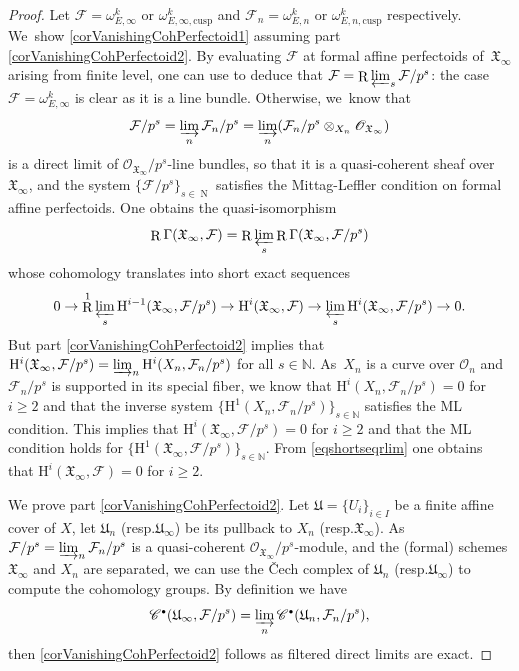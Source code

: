 \documentclass[11pt]{article}
\newcommand{\resp}{resp.\xspace}
\newcommand{\sbullet}{{\scriptscriptstyle\bullet}}
\newcommand{\cusp}{\mathrm{cusp}}
\numberwithin{equation}{section}
\theoremstyle{definition}
\newcommand{\bb}[1]{\mathbb{#1}}
\newcommand{\n}[1]{\mathcal{#1}}
\newcommand{\f}[1]{\mathfrak{#1}}
\newcommand{\s}[1]{\mathscr{#1}}
\DeclareMathOperator{\R}{R}
\DeclareMathOperator{\N}{N}
\begin{document}
\begin{proof}
Let $\n{F}= \omega^k_{E,\infty}$ or $\omega^{k}_{E,\infty,\cusp}$ and $\n{F}_n=\omega^k_{E,n}$ or $\omega^k_{E,n,\cusp}$ respectively. We~show \eqref{corVanishingCohPerfectoid1} assuming part \eqref{corVanishingCohPerfectoid2}. By evaluating $\n{F}$ at formal affine perfectoids of~$\f{X}_{\infty}$ arising from finite level, one can use \cite[Lem.\,3.18]{MR3090230} to deduce that $\n{F}= \R\varprojlim_s \n{F}/p^s$: the case $\n{F}= \omega_{E,\infty}^k$ is clear as it is a line bundle. Otherwise, we~know that
\[
\n{F}/p^s=\varinjlim_n \n{F}_n/p^s=\varinjlim_n (\n{F}_n/p^s\otimes_{X_n}\s{O}_{\f{X}_{\infty}})
\]
is a direct limit of $\s{O}_{\f{X}_{\infty}}/p^s$-line bundles, so that it is a quasi-coherent sheaf over~$\f{X}_{\infty}$, and the system $\{\n{F}/p^s\}_{s\in \N}$ satisfies the Mittag-Leffler condition on formal affine perfectoids. One obtains the quasi-isomorphism
\[
\R\Gamma(\f{X}_{\infty}, \n{F})= \R\varprojlim_s \R\Gamma(\f{X}_{\infty}, \n{F}/p^s)
\]
whose cohomology translates into short exact sequences
\begin{equation}
\label{eqshortseqrlim}
0\to \R^1\varprojlim_s \mathrm{H}^{i-1}(\f{X}_{\infty}, \n{F}/p^s) \to \mathrm{H}^{i}(\f{X}_{\infty}, \n{F}) \to \varprojlim_{s} \mathrm{H}^{i}(\f{X}_{\infty}, \n{F}/p^s) \to 0.
\end{equation}
But part \eqref{corVanishingCohPerfectoid2} implies that $\mathrm{H}^i(\f{X}_{\infty}, \n{F}/p^s)= \varinjlim_{n} \mathrm{H}^i(X_n, \n{F}_n/p^s)$ for all $s\in \bb{N}$. As~$X_n$ is a curve over $\n{O}_n$ and $\n{F}_n/p^s$ is supported in its special fiber, we know that $ \mathrm{H}^i(X_n, \n{F}_n/p^s)=0$ for $i\geq 2$ and that the inverse system $\{\mathrm{H}^1(X_n, \n{F}_n/p^s)\}_{s\in \bb{N}}$ satisfies the ML condition. This implies that $\mathrm{H}^i(\f{X}_{\infty}, \n{F}/p^s)=0$ for $i\geq 2$ and that the ML condition holds for $\{\mathrm{H}^1(\f{X}_{\infty}, \n{F}/p^s)\}_{s\in \bb{N}}$. From \eqref{eqshortseqrlim} one obtains that $\mathrm{H}^i(\f{X}_{\infty}, \n{F})=0$ for $i\geq 2$.

We prove part \eqref{corVanishingCohPerfectoid2}. Let $\f{U}=\{U_i\}_{i\in I}$ be a finite affine cover of $X$, let $\f{U}_n$ (\resp $\f{U}_{\infty}$) be its pullback to $X_n$ (\resp $\f{X}_{\infty}$). As $\n{F}/p^s=\varinjlim_n \n{F}_n/p^s$ is a quasi-coherent $\s{O}_{\f{X}_{\infty}}/p^s$-module, and the (formal) schemes $\f{X}_{\infty}$ and $X_n$ are separated, we can use the \v{C}ech complex of $\f{U}_n$ (\resp $\f{U}_{\infty}$) to compute the cohomology groups. By definition we have
\[
\s{C}^{\sbullet}(\f{U}_{\infty}, \n{F}/p^s) = \varinjlim_n \s{C}^{\sbullet}(\f{U}_n, \n{F}_n/p^s),
\]
then \eqref{corVanishingCohPerfectoid2} follows as filtered direct limits are exact.


\end{proof}
\end{document}
